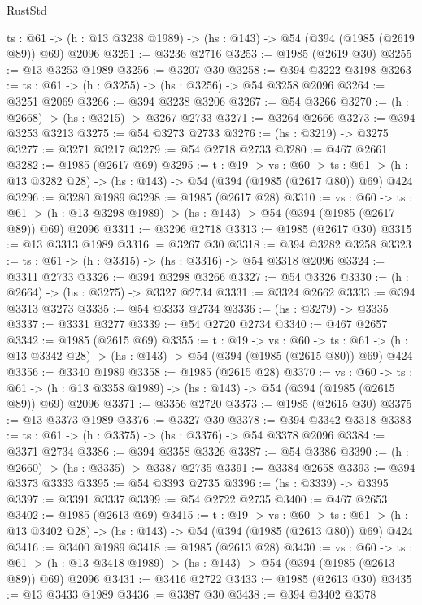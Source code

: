 \begin{lexlean}{RustStd}
\begin{coremodule}
{\begin{coremodule}
{{{{{{{{  {ts : @61} -> (h : @13 @3238 @1989) -> (hs : @143) -> @54 (@394 (@1985 (@2619 @89)) @69) @2096
@3251 := @3236 @2716
@3253 := @1985 (@2619 @30)
@3255 := @13 @3253 @1989
@3256 := @3207 @30
@3258 := @394 @3222 @3198
@3263 := {ts : @61} -> (h : @3255) -> (hs : @3256) -> @54 @3258 @2096
@3264 := @3251 @2069
@3266 := @394 @3238 @3206
@3267 := @54 @3266
@3270 := (h : @2668) -> (hs : @3215) -> @3267 @2733
@3271 := @3264 @2666
@3273 := @394 @3253 @3213
@3275 := @54 @3273 @2733
@3276 := (hs : @3219) -> @3275
@3277 := @3271 @3217
@3279 := @54 @2718 @2733
@3280 := @467 @2661
@3282 := @1985 (@2617 @69)
@3295 := {t : @19} ->
  {vs : @60} ->
  {ts : @61} -> (h : @13 @3282 @28) -> (hs : @143) -> @54 (@394 (@1985 (@2617 @80)) @69) @424
@3296 := @3280 @1989
@3298 := @1985 (@2617 @28)
@3310 := {vs : @60} ->
  {ts : @61} -> (h : @13 @3298 @1989) -> (hs : @143) -> @54 (@394 (@1985 (@2617 @89)) @69) @2096
@3311 := @3296 @2718
@3313 := @1985 (@2617 @30)
@3315 := @13 @3313 @1989
@3316 := @3267 @30
@3318 := @394 @3282 @3258
@3323 := {ts : @61} -> (h : @3315) -> (hs : @3316) -> @54 @3318 @2096
@3324 := @3311 @2733
@3326 := @394 @3298 @3266
@3327 := @54 @3326
@3330 := (h : @2664) -> (hs : @3275) -> @3327 @2734
@3331 := @3324 @2662
@3333 := @394 @3313 @3273
@3335 := @54 @3333 @2734
@3336 := (hs : @3279) -> @3335
@3337 := @3331 @3277
@3339 := @54 @2720 @2734
@3340 := @467 @2657
@3342 := @1985 (@2615 @69)
@3355 := {t : @19} ->
  {vs : @60} ->
  {ts : @61} -> (h : @13 @3342 @28) -> (hs : @143) -> @54 (@394 (@1985 (@2615 @80)) @69) @424
@3356 := @3340 @1989
@3358 := @1985 (@2615 @28)
@3370 := {vs : @60} ->
  {ts : @61} -> (h : @13 @3358 @1989) -> (hs : @143) -> @54 (@394 (@1985 (@2615 @89)) @69) @2096
@3371 := @3356 @2720
@3373 := @1985 (@2615 @30)
@3375 := @13 @3373 @1989
@3376 := @3327 @30
@3378 := @394 @3342 @3318
@3383 := {ts : @61} -> (h : @3375) -> (hs : @3376) -> @54 @3378 @2096
@3384 := @3371 @2734
@3386 := @394 @3358 @3326
@3387 := @54 @3386
@3390 := (h : @2660) -> (hs : @3335) -> @3387 @2735
@3391 := @3384 @2658
@3393 := @394 @3373 @3333
@3395 := @54 @3393 @2735
@3396 := (hs : @3339) -> @3395
@3397 := @3391 @3337
@3399 := @54 @2722 @2735
@3400 := @467 @2653
@3402 := @1985 (@2613 @69)
@3415 := {t : @19} ->
  {vs : @60} ->
  {ts : @61} -> (h : @13 @3402 @28) -> (hs : @143) -> @54 (@394 (@1985 (@2613 @80)) @69) @424
@3416 := @3400 @1989
@3418 := @1985 (@2613 @28)
@3430 := {vs : @60} ->
  {ts : @61} -> (h : @13 @3418 @1989) -> (hs : @143) -> @54 (@394 (@1985 (@2613 @89)) @69) @2096
@3431 := @3416 @2722
@3433 := @1985 (@2613 @30)
@3435 := @13 @3433 @1989
@3436 := @3387 @30
@3438 := @394 @3402 @3378
}}}}}}}}
\end{coremodule}}
\end{coremodule}
\end{lexlean}
